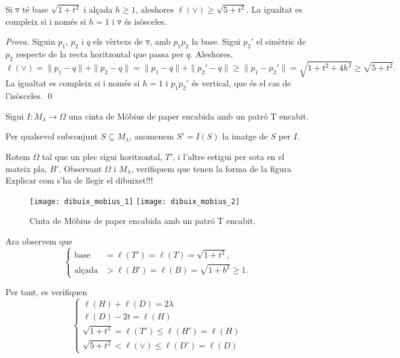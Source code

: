 \begin{defi}
    Si $\triangledown$ té base $\sqrt{1+t^2}$ i alçada $h\ge1$, aleshores $\ell(\lor)\ge\sqrt{5+t^2}$. La igualtat es compleix si i només si $h=1$ i $\triangledown$ és isòsceles.
\end{defi}

{
    \color{green!50!black}
    \textit{Prova.}
    Siguin $p_1$, $p_2$ i $q$ els vèrtexs de $\triangledown$, amb $p_1p_2$ la base. Sigui $p_2'$ el simètric de $p_2$ respecte de la recta horitzontal que passa per $q$. Aleshores,
    \begin{equation*}
        \ell(\lor) = \|p_1-q\| + \|p_2-q\| = \|p_1-q\| + \|p_2'-q\| \ge \|p_1-p_2'\| = \sqrt{1+t^2+4h^2}\ge\sqrt{5+t^2}.
    \end{equation*}
    La igualtat es compleix si i només si $h=1$ i $p_1p_2'$ és vertical, que és el cas de l'isòsceles.
    \qed
}

Sigui $I:M_\lambda\to\Omega$ una cinta de Möbius de paper encabida amb un patró T encabit.
\begin{nota}
    Per qualsevol subconjunt $S\subseteq M_\lambda$, anomenem $S'=I(S)$ la imatge de $S$ per $I$.
\end{nota}

Rotem $\Omega$ tal que un plec sigui horitzontal, $T'$, i l'altre estigui per sota en el mateix pla, $B'$. Observant $\Omega$ i $M_\lambda$, verifiquem que tenen la forma de la figura {\color{red} Explicar com s'ha de llegir el dibuixet!!!}

\begin{figure}[htbp]
    \centering
    \texttt{[image: dibuix\_mobius\_1]}
    \quad
    \raisebox{4\height}{$\xrightarrow{\scalebox{1.5}{$I$}}$}
    \quad
    \texttt{[image: dibuix\_mobius\_2]}
    \caption{Cinta de Möbius de paper encabida amb un patró T encabit.}
    \label{fig:mobius_1}
\end{figure}

Ara observem que 
\begin{equation*}
    \begin{cases}
        \text{base} &= \ell(T') = \ell(T) = \sqrt{1+t^2},\\
        \text{alçada} &> \ell(B') = \ell(B) = \sqrt{1+b^2}\ge1.
    \end{cases}
\end{equation*}

Per tant, es verifiquen
\begin{equation*}
    \begin{cases}
        \ell(H) + \ell(D) = 2\lambda\\
        \ell(D)-2t=\ell(H)\\
        \sqrt{1+t^2}=\ell(T')\le\ell(H')=\ell(H)\\
        \sqrt{5+t^2}<\ell(\lor)\le\ell(D')=\ell(D)
    \end{cases}
\end{equation*}

